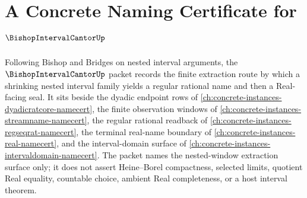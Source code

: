 \chapter{A Concrete Naming Certificate for $\BishopIntervalCantorUp$}
\label{ch:concrete-instances-bishop-interval-cantor-namecert}

Following Bishop and Bridges on nested interval arguments, the $\BishopIntervalCantorUp$ packet records the finite extraction route by which a shrinking nested interval family yields a regular rational name and then a Real-facing seal. It sits beside the dyadic endpoint rows of \autoref{ch:concrete-instances-dyadicratcore-namecert}, the finite observation windows of \autoref{ch:concrete-instances-streamname-namecert}, the regular rational readback of \autoref{ch:concrete-instances-regseqrat-namecert}, the terminal real-name boundary of \autoref{ch:concrete-instances-real-namecert}, and the interval-domain surface of \autoref{ch:concrete-instances-intervaldomain-namecert}. The packet names the nested-window extraction surface only; it does not assert Heine--Borel compactness, selected limits, quotient Real equality, countable choice, ambient Real completeness, or a host interval theorem.

